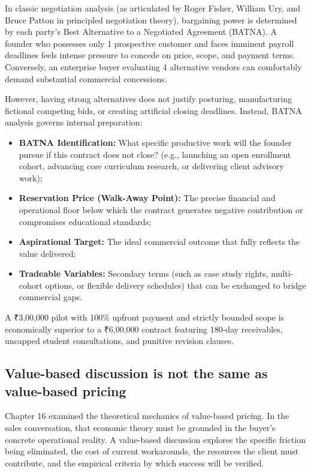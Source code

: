 In classic negotiation analysis (as articulated by Roger Fisher, William Ury, and Bruce Patton in principled negotiation theory), bargaining power is determined by each party's Best Alternative to a Negotiated Agreement (BATNA). A founder who possesses only 1 prospective customer and faces imminent payroll deadlines feels intense pressure to concede on price, scope, and payment terms. Conversely, an enterprise buyer evaluating 4 alternative vendors can comfortably demand substantial commercial concessions.

However, having strong alternatives does not justify posturing, manufacturing fictional competing bids, or creating artificial closing deadlines. Instead, BATNA analysis governs internal preparation:
\begin{itemize}
\item \textbf{BATNA Identification:} What specific productive work will the founder pursue if this contract does not close? (e.g., launching an open enrollment cohort, advancing core curriculum research, or delivering client advisory work);
\item \textbf{Reservation Price (Walk-Away Point):} The precise financial and operational floor below which the contract generates negative contribution or compromises educational standards;
\item \textbf{Aspirational Target:} The ideal commercial outcome that fully reflects the value delivered;
\item \textbf{Tradeable Variables:} Secondary terms (such as case study rights, multi-cohort options, or flexible delivery schedules) that can be exchanged to bridge commercial gaps.
\end{itemize}
A ₹3,00,000 pilot with 100\% upfront payment and strictly bounded scope is economically superior to a ₹6,00,000 contract featuring 180-day receivables, uncapped student consultations, and punitive revision clauses.

\subsection{Value-based discussion is not the same as value-based pricing}

Chapter 16 examined the theoretical mechanics of value-based pricing. In the sales conversation, that economic theory must be grounded in the buyer's concrete operational reality. A value-based discussion explores the specific friction being eliminated, the cost of current workarounds, the resources the client must contribute, and the empirical criteria by which success will be verified.

